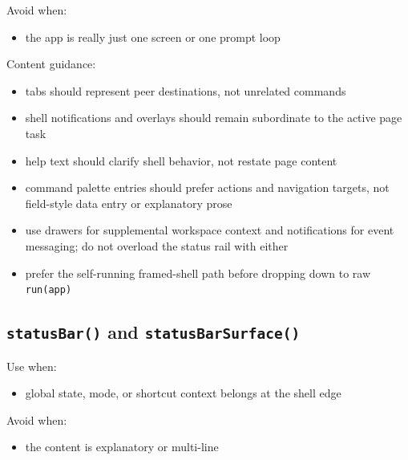 Avoid when:

\begin{itemize}
\tightlist
\item
  the app is really just one screen or one prompt loop
\end{itemize}

Content guidance:

\begin{itemize}
\tightlist
\item
  tabs should represent peer destinations, not unrelated commands
\item
  shell notifications and overlays should remain subordinate to the active page task
\item
  help text should clarify shell behavior, not restate page content
\item
  command palette entries should prefer actions and navigation targets, not field-style data entry or explanatory prose
\item
  use drawers for supplemental workspace context and notifications for event messaging; do not overload the status rail with either
\item
  prefer the self-running framed-shell path before dropping down to raw \texttt{r\allowbreak{}u\allowbreak{}n\allowbreak{}(\allowbreak{}a\allowbreak{}p\allowbreak{}p\allowbreak{})}
\end{itemize}

\subsection{\texorpdfstring{\texttt{s\allowbreak{}t\allowbreak{}a\allowbreak{}t\allowbreak{}u\allowbreak{}s\allowbreak{}B\allowbreak{}a\allowbreak{}r\allowbreak{}(\allowbreak{})} and \texttt{s\allowbreak{}t\allowbreak{}a\allowbreak{}t\allowbreak{}u\allowbreak{}s\allowbreak{}B\allowbreak{}a\allowbreak{}r\allowbreak{}S\allowbreak{}u\allowbreak{}r\allowbreak{}f\allowbreak{}a\allowbreak{}c\allowbreak{}e\allowbreak{}(\allowbreak{})}}{ and }}\label{record-023-statusbar-and-statusbarsurface}

Use when:

\begin{itemize}
\tightlist
\item
  global state, mode, or shortcut context belongs at the shell edge
\end{itemize}

Avoid when:

\begin{itemize}
\tightlist
\item
  the content is explanatory or multi-line
\end{itemize}

